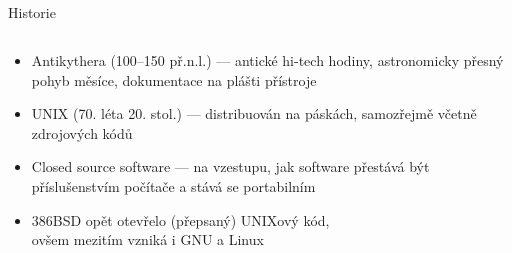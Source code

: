 \documentclass{beamer}
\begin{document}
\subsection{}
\begin{frame}{Historie}
\begin{columns}
\begin{column}{9cm}
\begin{itemize}
\item Antikythera (100--150 př.n.l.) --- antické hi-tech hodiny, astronomicky přesný pohyb měsíce, dokumentace na plášti přístroje
\item UNIX (70. léta 20. stol.) --- distribuován na páskách, samozřejmě včetně zdrojových kódů
\item Closed source software --- na vzestupu, jak software přestává být příslušenstvím počítače a stává se portabilním
\item 386BSD opět otevřelo (přepsaný) UNIXový kód,\\ovšem mezitím vzniká i GNU a Linux
\end{itemize}
\end{column}
\end{columns}
\end{frame}
\end{document}
